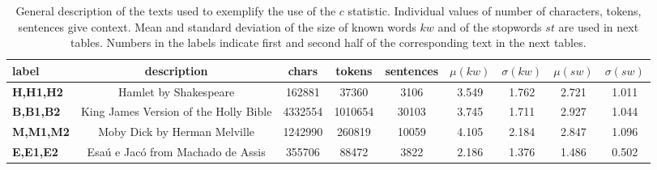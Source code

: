 \begin{table*}[h!]
\begin{center}
\begin{tabular}{| l | c | c | c | c | c | c | c | c |}\hline
label & description & chars & tokens & sentences & $\mu(kw)$ & $\sigma(kw)$ & $\mu(sw)$ & $\sigma(sw)$ \\\hline
{\bf H,H1,H2} & Hamlet by Shakespeare & 162881 & 37360 & 3106 & 3.549 & 1.762 & 2.721 & 1.011 \\\hline
{\bf B,B1,B2} & King James Version of the Holly Bible & 4332554 & 1010654 & 30103 & 3.745 & 1.711 & 2.927 & 1.044 \\\hline
{\bf M,M1,M2} & Moby Dick by Herman Melville & 1242990 & 260819 & 10059 & 4.105 & 2.184 & 2.847 & 1.096 \\\hline
{\bf E,E1,E2} & Esa\'u e Jac\'o from Machado de Assis & 355706 & 88472 & 3822 & 2.186 & 1.376 & 1.486 & 0.502 \\\hline
\end{tabular}
\caption{General description of the texts used to exemplify the use of the $c$ statistic.
Individual values of number of characters, tokens, sentences give context.
Mean and standard deviation of the size of known words $kw$ and of the stopwords
$st$ are used in next tables.
Numbers in the labels indicate first and second half of the corresponding text in the next tables.}
\end{center}
\end{table*}